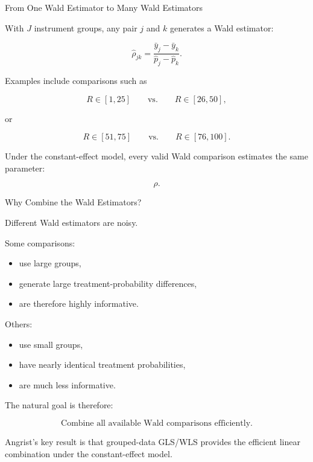 \documentclass[aspectratio=169]{beamer}
\begin{document}
\begin{frame}{From One Wald Estimator to Many Wald Estimators}

With \(J\) instrument groups, any pair \(j\) and \(k\) generates a Wald estimator:

\[
\boxed{
\hat\rho_{jk}
=
\frac{
\bar y_j-\bar y_k
}{
\hat p_j-\hat p_k
}.
}
\]

Examples include comparisons such as

\[
R\in[1,25]
\qquad\text{vs.}\qquad
R\in[26,50],
\]

or

\[
R\in[51,75]
\qquad\text{vs.}\qquad
R\in[76,100].
\]

Under the constant-effect model, every valid Wald comparison estimates the same parameter:

\[
\rho.
\]

\end{frame}

\begin{frame}{Why Combine the Wald Estimators?}

Different Wald estimators are noisy.

Some comparisons:

\begin{itemize}
    \item use large groups,
    \item generate large treatment-probability differences,
    \item are therefore highly informative.
\end{itemize}

Others:

\begin{itemize}
    \item use small groups,
    \item have nearly identical treatment probabilities,
    \item are much less informative.
\end{itemize}

The natural goal is therefore:

\[
\boxed{
\text{Combine all available Wald comparisons efficiently.}
}
\]

Angrist's key result is that grouped-data GLS/WLS provides the efficient linear combination under the constant-effect model.

\end{frame}
\end{document}

